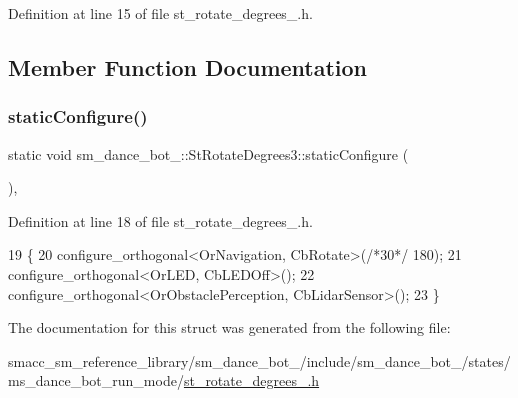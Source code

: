 Definition at line 15 of file st\+\_\+rotate\+\_\+degrees\+\_.\+h.



\subsection{Member Function Documentation}
\mbox{\label{structsm__dance__bot__2_1_1StRotateDegrees3_a9d399bede58a43d648f230e5c61f0f32}} 
\subsubsection{\texorpdfstring{static\+Configure()}{staticConfigure()}}
{\footnotesize\ttfamily static void sm\+\_\+dance\+\_\+bot\+\_\+::\+St\+Rotate\+Degrees3\+::static\+Configure (\begin{DoxyParamCaption}{ }\end{DoxyParamCaption})\hspace{0.3cm}{\ttfamily [inline]}, {\ttfamily [static]}}



Definition at line 18 of file st\+\_\+rotate\+\_\+degrees\+\_.\+h.


\begin{DoxyCode}
19   \{
20     configure\_orthogonal<OrNavigation, CbRotate>(\textcolor{comment}{/*30*/} 180);
21     configure\_orthogonal<OrLED, CbLEDOff>();
22     configure\_orthogonal<OrObstaclePerception, CbLidarSensor>();
23   \}
\end{DoxyCode}


The documentation for this struct was generated from the following file\+:\begin{DoxyCompactItemize}
\item 
smacc\+\_\+sm\+\_\+reference\+\_\+library/sm\+\_\+dance\+\_\+bot\+\_/include/sm\+\_\+dance\+\_\+bot\+\_/states/ms\+\_\+dance\+\_\+bot\+\_\+run\+\_\+mode/\hyperlink{sm__dance__bot__2_2include_2sm__dance__bot__2_2states_2ms__dance__bot__run__mode_2st__rotate__degrees__3_8h}{st\+\_\+rotate\+\_\+degrees\+\_.\+h}\end{DoxyCompactItemize}
